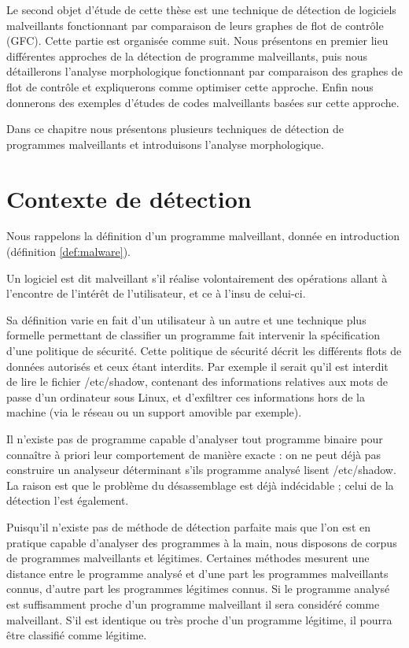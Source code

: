 Le second objet d'étude de cette thèse est une technique de détection de logiciels malveillants fonctionnant par comparaison de leurs graphes de flot de contrôle (GFC).
Cette partie est organisée comme suit. Nous présentons en premier lieu différentes approches de la détection de programme malveillants, puis nous détaillerons l'analyse morphologique fonctionnant par comparaison des graphes de flot de contrôle et expliquerons comme optimiser cette approche. Enfin nous donnerons des exemples d'études de codes malveillants basées sur cette approche.

Dans ce chapitre nous présentons plusieurs techniques de détection de programmes malveillants et introduisons l'analyse morphologique.

\section{Contexte de détection}
Nous rappelons la définition d'un programme malveillant, donnée en introduction (définition \ref{def:malware}).

\begin{defi}
Un logiciel est dit malveillant s'il réalise volontairement des opérations allant à l'encontre de l'intérêt de l'utilisateur, et ce à l'insu de celui-ci.
\label{def:malware}
\end{defi}

Sa définition varie en fait d'un utilisateur à un autre et une technique plus formelle permettant de classifier un programme fait intervenir la spécification d'une politique de sécurité. 
Cette politique de sécurité décrit les différents flots de données autorisés et ceux étant interdits. Par exemple il serait qu'il est interdit de lire le fichier /etc/shadow, contenant des informations relatives aux mots de passe d'un ordinateur sous Linux, et d'exfiltrer ces informations hors de la machine (via le réseau ou un support amovible par exemple).

Il n'existe pas de programme capable d'analyser tout programme binaire pour connaître à priori leur comportement de manière exacte : on ne peut déjà pas construire un analyseur déterminant s'ils programme analysé lisent /etc/shadow.
La raison est que le problème du désassemblage est déjà indécidable ; celui de la détection l'est également.

Puisqu'il n'existe pas de méthode de détection parfaite mais que l'on est en pratique capable d'analyser des programmes à la main, nous disposons de corpus de programmes malveillants et légitimes.
Certaines méthodes mesurent une distance entre le programme analysé et d'une part les programmes malveillants connus, d'autre part les programmes légitimes connus. Si le programme analysé est suffisamment proche d'un programme malveillant il sera considéré comme malveillant. S'il est identique ou très proche d'un programme légitime, il pourra être classifié comme légitime.


